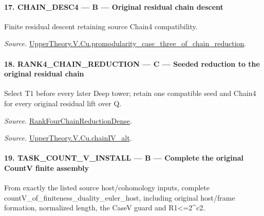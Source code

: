 \paragraph{17. CHAIN\_\allowbreak DESC4 — B — Original residual chain descent}

Finite residual descent retaining source Chain4 compatibility.

\emph{Source.} \href{https://github.com/CocoSgt/riemann-hypothesis-lean/blob/7cbf7a0c32fca1badf05931879a37c3f8a2b03b4/src/Development/AutomorphicArithmetic/AutomorphicVarieties/ModularityArgument/ThresholdArguments/DenseThresholdCases/PromodularityCaseThreeOfLemmas.lean#L131-L153}{UpperTheory.V.Cu.promodularity\_\allowbreak case\_\allowbreak three\_\allowbreak of\_\allowbreak chain\_\allowbreak reduction}.



\paragraph{18. RANK4\_\allowbreak CHAIN\_\allowbreak REDUCTION — C — Seeded reduction to the original residual chain}

Select T1 before every later Deep tower; retain one compatible seed and Chain4 for every original residual lift over Q.

\emph{Source.} \href{https://github.com/CocoSgt/riemann-hypothesis-lean/blob/7cbf7a0c32fca1badf05931879a37c3f8a2b03b4/src/Development/AutomorphicArithmetic/AutomorphicVarieties/ModularityArgument/ThresholdArguments/DenseThresholdCases/PromodularityCaseThree.lean#L33-L39}{RankFourChainReductionDense}.

\emph{Source.} \href{https://github.com/CocoSgt/riemann-hypothesis-lean/blob/7cbf7a0c32fca1badf05931879a37c3f8a2b03b4/src/Development/AutomorphicArithmetic/AutomorphicVarieties/ModularityArgument/ThresholdArguments/DenseThresholdCases/CuPChainIV.lean#L16-L82}{UpperTheory.V.Cu.chainIV\_\allowbreak alt}.



\paragraph{19. TASK\_\allowbreak COUNT\_\allowbreak V\_\allowbreak INSTALL — B — Complete the original CountV finite assembly}

From exactly the listed source host/cohomology inputs, complete countV\_\allowbreak of\_\allowbreak finiteness\_\allowbreak duality\_\allowbreak euler\_\allowbreak host, including original host/frame formation, normalized length, the CaseV guard and R1<=2\textasciicircum{}c2.

